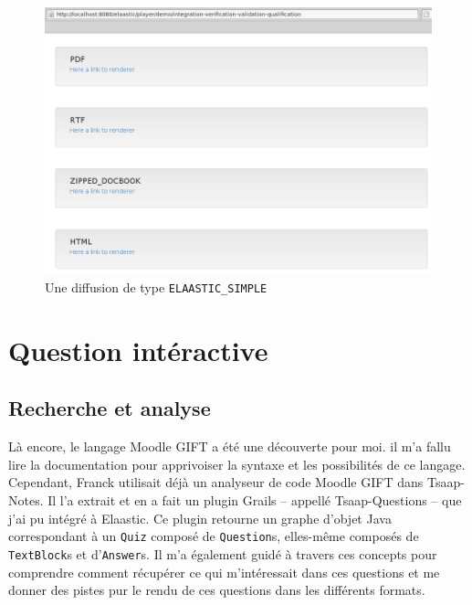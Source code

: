 \begin{figure}[h]
  \centering
  \includegraphics[width=15cm]{images/diffusion.png}
  \caption{Une diffusion de type {\tt ELAASTIC\_SIMPLE}}
  \label{fig:diffusion}
\end{figure}

\section{Question intéractive}
\subsection{Recherche et analyse}
Là encore, le langage Moodle GIFT a été une découverte pour moi. il m'a fallu
lire la documentation pour apprivoiser la syntaxe et les possibilités de ce
langage. Cependant, Franck utilisait déjà un analyseur de code Moodle GIFT dans
Tsaap-Notes. Il l'a extrait et en a fait un plugin Grails -- appellé
Tsaap-Questions -- que j'ai pu intégré à Elaastic. Ce plugin retourne un graphe
d'objet Java correspondant à un {\tt Quiz} composé de {\tt Question}s,
elles-même composés de {\tt TextBlock}s et d'{\tt Answer}s. Il m'a également
guidé à travers ces concepts pour comprendre comment récupérer ce qui
m'intéressait dans ces questions et me donner des pistes pur le rendu de ces
questions dans les différents formats.\\

